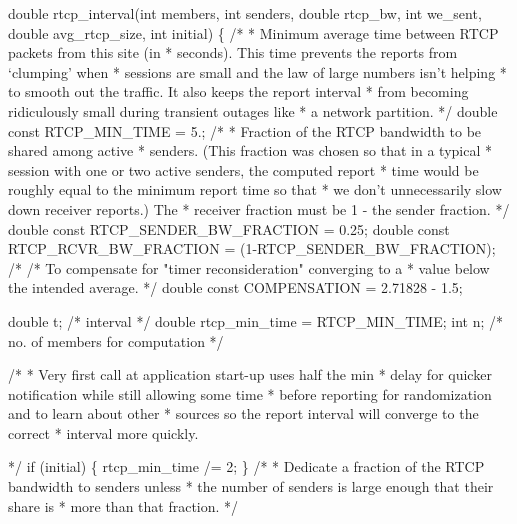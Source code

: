 \documentclass{article}
\begin{document}
\begin{itemize}
double rtcp\_interval(int members, int senders, double rtcp\_bw, int we\_sent, double avg\_rtcp\_size, int initial) \{ /* * Minimum average time between RTCP packets from this site (in * seconds).  This time prevents the reports from `clumping' when * sessions are small and the law of large numbers isn't helping * to smooth out the traffic.  It also keeps the report interval * from becoming ridiculously small during transient outages like * a network partition. */ double const RTCP\_MIN\_TIME = 5.; /* * Fraction of the RTCP bandwidth to be shared among active * senders.  (This fraction was chosen so that in a typical * session with one or two active senders, the computed report * time would be roughly equal to the minimum report time so that * we don't unnecessarily slow down receiver reports.)  The * receiver fraction must be 1 - the sender fraction. */ double const RTCP\_SENDER\_BW\_FRACTION = 0.25; double const RTCP\_RCVR\_BW\_FRACTION = (1-RTCP\_SENDER\_BW\_FRACTION); /* /* To compensate for "timer reconsideration" converging to a * value below the intended average. */ double const COMPENSATION = 2.71828 - 1.5;

double t;                   /* interval */ double rtcp\_min\_time = RTCP\_MIN\_TIME; int n;                      /* no. of members for computation */

/* * Very first call at application start-up uses half the min * delay for quicker notification while still allowing some time * before reporting for randomization and to learn about other * sources so the report interval will converge to the correct * interval more quickly.

*/ if (initial) \{ rtcp\_min\_time /= 2; \} /* * Dedicate a fraction of the RTCP bandwidth to senders unless * the number of senders is large enough that their share is * more than that fraction. */

\end{itemize}
\end{document}
